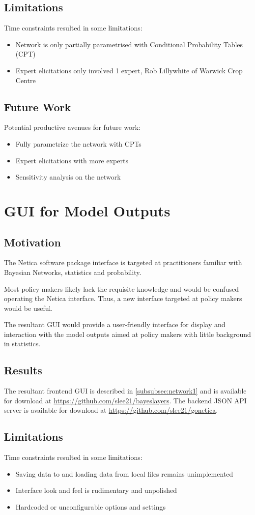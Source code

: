 \documentclass[12pt,notitlepage]{article}
\begin{document}
\begin{multicols}{2}
\subsection{Limitations}
Time constraints resulted in some limitations:
\begin{itemize}
\item Network is only partially parametrised with Conditional Probability Tables (CPT)
\item Expert elicitations only involved 1 expert, Rob Lillywhite of Warwick Crop Centre
\end{itemize}
\subsection{Future Work}
Potential productive avenues for future work:
\begin{itemize}
\item Fully parametrize the network with CPTs
\item Expert elicitations with more experts
\item Sensitivity analysis on the network
\end{itemize}
\section{GUI for Model Outputs}\label{sec:guidevel}
\subsection{Motivation}
The Netica software package interface is targeted at practitioners familiar with Bayesian Networks, statistics and probability. 

Most policy makers likely lack the requisite knowledge and would be confused operating the Netica interface. Thus, a new interface targeted at policy makers would be useful.

The resultant GUI would provide a user-friendly interface for display and interaction with the model outputs aimed at policy makers with little background in statistics.
\subsection{Results}
The resultant frontend GUI is described in \ref{subsubsec:network1} and is available for download at \url{https://github.com/slee21/bayeslayers}. The backend JSON API server is available for download at \url{https://github.com/slee21/gonetica}.
\subsection{Limitations}
Time constraints resulted in some limitations:
\begin{itemize}
\item Saving data to and loading data from local files remains unimplemented
\item Interface look and feel is rudimentary and unpolished
\item Hardcoded or unconfigurable options and settings
\end{itemize}

\end{multicols}
\end{document}
